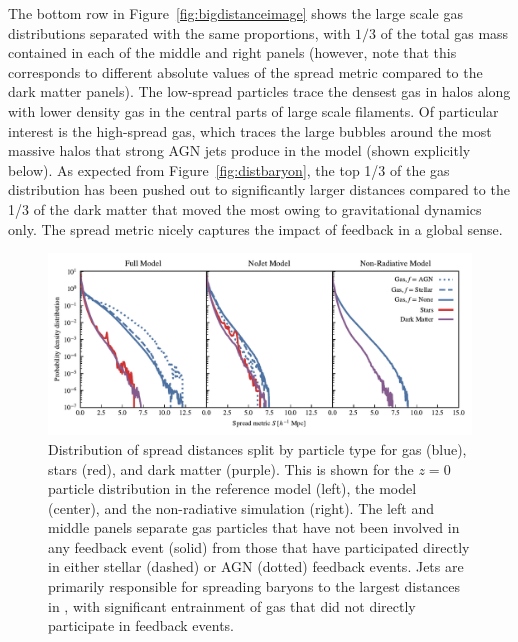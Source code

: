 The bottom row in Figure~\ref{fig:bigdistanceimage} shows the large scale gas distributions separated with the same proportions, with $1/3$ of the total gas mass contained in each of the middle and right panels (however, note that this corresponds to different absolute values of the spread metric compared to the dark matter panels). The low-spread particles trace the densest gas in halos
along with lower density gas in the central parts of large scale filaments.
Of particular interest is the high-spread gas, which traces the large bubbles around the most massive halos that strong AGN jets produce in the \simba{} model (shown explicitly below). 
As expected from Figure~\ref{fig:distbaryon}, the top 1/3 of the gas distribution has been pushed out to significantly larger distances compared to the 1/3 of the dark matter that moved the most owing to gravitational dynamics only.  The spread metric nicely captures the impact of feedback in a global sense.


\begin{figure}
    \centering
    \includegraphics[width=\textwidth]{figures/neighbour_analysis_feedback_histogram_combined.pdf}
    \vspace{-0.7cm}
    \caption{Distribution of spread distances
    split by particle type for gas (blue), stars (red), and dark matter (purple).  This is shown for the $z=0$ particle distribution in the
    reference model (left), the \nojet{} model (center), and the non-radiative simulation
    (right). The left and middle panels separate gas particles that have not been involved in any feedback event (solid) from those that have participated directly in either stellar (dashed) or AGN (dotted) feedback events. 
    Jets are primarily responsible for spreading baryons to the largest distances in \simba{}, with significant entrainment of gas that did not directly participate in feedback events. 
    }\label{fig:feedbackdistance}
\end{figure}


